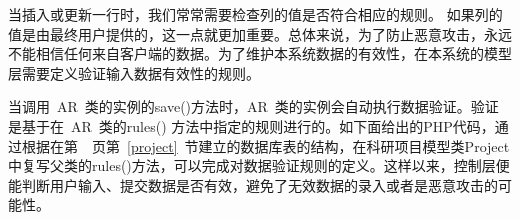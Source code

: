 当插入或更新一行时，我们常常需要检查列的值是否符合相应的规则。 如果列的值是由最终用户提供的，这一点就更加重要。总体来说，为了防止恶意攻击，永远不能相信任何来自客户端的数据。为了维护本系统数据的有效性，在本系统的模型层需要定义验证输入数据有效性的规则。

当调用~AR~类的实例的save()方法时，AR~类的实例会自动执行数据验证。验证是基于在~AR~类的rules() 方法中指定的规则进行的。如下面给出的PHP代码，通过根据在第~\pageref{project}~页第~\ref{project}~节建立的数据库表的结构，在科研项目模型类Project中复写父类的rules()方法，可以完成对数据验证规则的定义。这样以来，控制层便能判断用户输入、提交数据是否有效，避免了无效数据的录入或者是恶意攻击的可能性。

\noindent
\ttfamily
\hlstd{}\hlstd{}\hlstd{}\hlopt{()}\hspace*{\fill}\\
\hlstd{}\hlopt{\{}\hspace*{\fill}\\
\hlstd{}\hlstd{\ \ \ \ }\hlstd{}\hlstd{}\hlopt{(}\hspace*{\fill}\\
\hlstd{}\hlstd{\ \ \ \ \ \ \ \ }\hlstd{}\hlstd{}\hlopt{(}\hlstd{}\hlstd{}\hlopt{,}\hlstd{}\hlstd{}\hlopt{),}\hspace*{\fill}\\
\hlstd{}\hlstd{\ \ \ \ \ \ \ \ }\hlstd{}\hlstd{}\hlopt{(}\hlstd{}\Righttorque\hspace*{\fill}\\
\hlstr{}\hlstd{\ \ \ \ \ \ \ \ }\Righttorque\hspace*{\fill}\\
\hlstr{}\hlstd{\ \ \ \ \ \ \ \ }\hlstd{}\hlopt{,\ }\hlstd{}\hlstd{}\hlopt{,\ }\Righttorque\hspace*{\fill}\\
\hlstd{}\hlstd{\ \ \ \ \ \ \ \ }\hlstd{}\hlstd{}\hlopt{=$>$}\hlopt{),}\hspace*{\fill}\\
\hlstd{}\hlstd{\ \ \ \ \ \ \ \ }\hlstd{}\hlstd{}\hlopt{(}\hlstd{}\hlstd{}\hlopt{,\ }\hlstd{}\hlstd{}\hlopt{,\ }\hlstd{}\hlstd{}\hlopt{=$>$}\Righttorque\hspace*{\fill}\\
